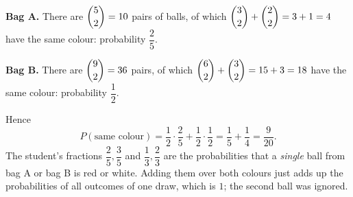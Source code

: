 \textbf{Bag A.} There are $\dbinom52=10$ pairs of balls, of which $\dbinom32+\dbinom22=3+1=4$ have the same colour: probability $\dfrac{2}{5}$.

\textbf{Bag B.} There are $\dbinom92=36$ pairs, of which $\dbinom62+\dbinom32=15+3=18$ have the same colour: probability $\dfrac{1}{2}$.

Hence
\[
P(\text{same colour})=\dfrac{1}{2}\cdot\dfrac{2}{5}+\dfrac{1}{2}\cdot\dfrac{1}{2}=\dfrac{1}{5}+\dfrac{1}{4}=\boxed{\dfrac{9}{20}} .
\]
The student's fractions $\dfrac{2}{5},\dfrac{3}{5}$ and $\dfrac{1}{3},\dfrac{2}{3}$ are the probabilities that a \emph{single} ball from bag A or bag B is red or white. Adding them over both colours just adds up the probabilities of all outcomes of one draw, which is $1$; the second ball was ignored.
